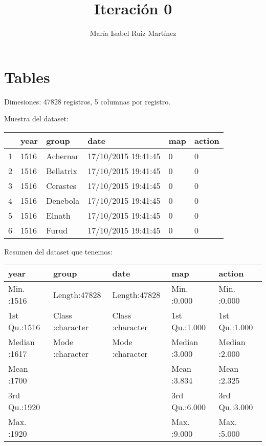\documentclass[10pt,a4paper]{article}
\author{María Isabel Ruiz Martínez}
\title{Iteración 0}
\begin{document}
\maketitle

\section{Tables}

Dimesiones: 47828 registros, 5 columnas por registro.

Muestra del dataset:
\begin{table}[ht]
\centering
\begin{tabular}{rlllll}
  \hline
 & year & group & date & map & action \\ 
  \hline
1 & 1516 & Achernar & 17/10/2015 19:41:45 & 0 & 0 \\ 
  2 & 1516 & Bellatrix & 17/10/2015 19:41:45 & 0 & 0 \\ 
  3 & 1516 & Cerastes & 17/10/2015 19:41:45 & 0 & 0 \\ 
  4 & 1516 & Denebola & 17/10/2015 19:41:45 & 0 & 0 \\ 
  5 & 1516 & Elnath & 17/10/2015 19:41:45 & 0 & 0 \\ 
  6 & 1516 & Furud & 17/10/2015 19:41:45 & 0 & 0 \\ 
   \hline
\end{tabular}
\end{table}

Resumen del dataset que tenemos:
\begin{table}[ht]
\centering
\begin{tabular}{lllll}
  \hline
     year &    group &     date &      map &     action \\ 
  \hline
Min.   :1516   & Length:47828       & Length:47828       & Min.   :0.000   & Min.   :0.000   \\ 
  1st Qu.:1516   & Class :character   & Class :character   & 1st Qu.:1.000   & 1st Qu.:1.000   \\ 
  Median :1617   & Mode  :character   & Mode  :character   & Median :3.000   & Median :2.000   \\ 
  Mean   :1700   &  &  & Mean   :3.834   & Mean   :2.325   \\ 
  3rd Qu.:1920   &  &  & 3rd Qu.:6.000   & 3rd Qu.:3.000   \\ 
  Max.   :1920   &  &  & Max.   :9.000   & Max.   :5.000   \\ 
   \hline
\end{tabular}
\end{table}
\end{document}
